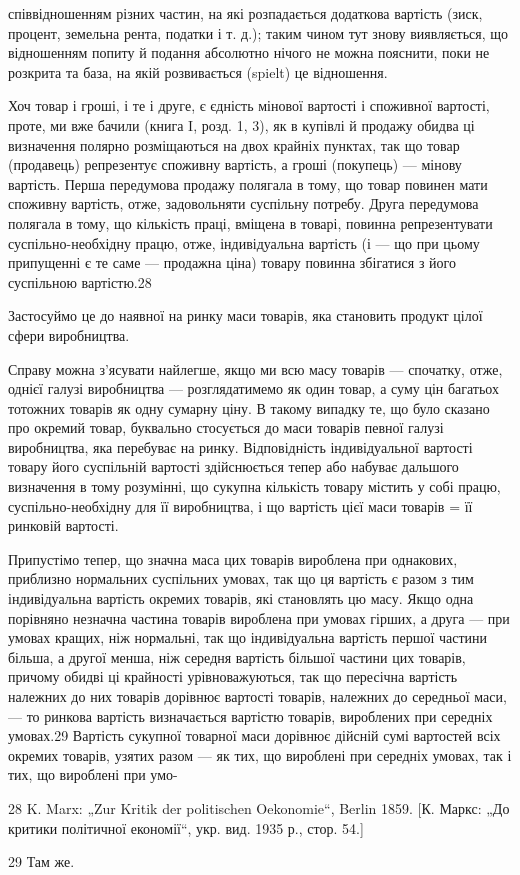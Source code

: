 співвідношенням різних частин, на які розпадається додаткова
вартість (зиск, процент, земельна рента, податки і т. д.); таким
чином тут знову виявляється, що відношенням попиту й подання
абсолютно нічого не можна пояснити, поки не розкрита та база,
на якій розвивається (spielt) це відношення.

Хоч товар і гроші, і те і друге, є єдність мінової вартості
і споживної вартості, проте, ми вже бачили (книга I, розд. 1, 3),
як в купівлі й продажу обидва ці визначення полярно розміщаються на двох крайніх пунктах, так що
товар (продавець)
репрезентує споживну вартість, а гроші (покупець) — мінову вартість. Перша передумова продажу
полягала в тому, що товар
повинен мати споживну вартість, отже, задовольняти суспільну
потребу. Друга передумова полягала в тому, що кількість
праці, вміщена в товарі, повинна репрезентувати суспільно-необхідну працю, отже, індивідуальна
вартість (і — що при цьому
припущенні є те саме — продажна ціна) товару повинна збігатися з його суспільною вартістю.28

Застосуймо це до наявної на ринку маси товарів, яка становить продукт цілої сфери виробництва.

Справу можна з’ясувати найлегше, якщо ми всю масу товарів — спочатку, отже, однієї галузі
виробництва — розглядатимемо
як один товар, а суму цін багатьох тотожних товарів як одну
сумарну ціну. В такому випадку те, що було сказано про окремий товар, буквально стосується до маси
товарів певної галузі
виробництва, яка перебуває на ринку. Відповідність індивідуальної вартості товару його суспільній
вартості здійснюється тепер
або набуває дальшого визначення в тому розумінні, що сукупна
кількість товару містить у собі працю, суспільно-необхідну для
її виробництва, і що вартість цієї маси товарів = її ринковій
вартості.

Припустімо тепер, що значна маса цих товарів вироблена
при однакових, приблизно нормальних суспільних умовах, так
що ця вартість є разом з тим індивідуальна вартість окремих
товарів, які становлять цю масу. Якщо одна порівняно незначна
частина товарів вироблена при умовах гірших, а друга — при умовах
кращих, ніж нормальні, так що індивідуальна вартість першої
частини більша, а другої менша, ніж середня вартість більшої частини цих товарів, причому обидві ці
крайності урівноважуються,
так що пересічна вартість належних до них товарів дорівнює
вартості товарів, належних до середньої маси, — то ринкова вартість визначається вартістю товарів,
вироблених при середніх
умовах.29 Вартість сукупної товарної маси дорівнює дійсній сумі
вартостей всіх окремих товарів, узятих разом — як тих, що вироблені при середніх умовах, так і тих,
що вироблені при умо-

28 K. Marx: „Zur Kritik der politischen Oekonomie“, Berlin 1859. [К. Маркс:
„До критики політичної економії“, укр. вид. 1935 р., стор. 54.]

29 Там же.
